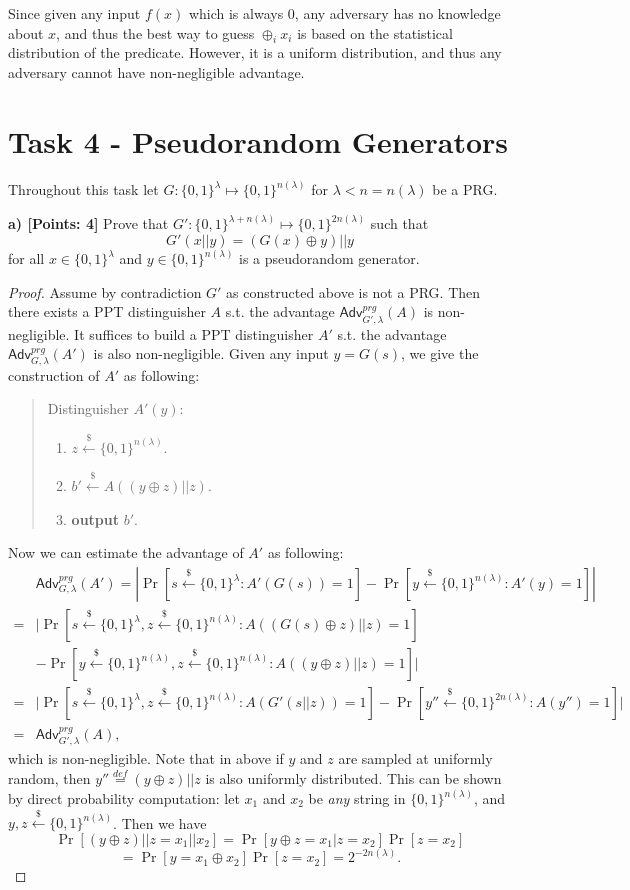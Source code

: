 \documentclass[12pt]{article}
\newcommand{\eqdef}{\stackrel{def}{=}}
\newcommand{\bits}{\{0,1\}}
\newcommand{\getsr}{\stackrel{\$}{\gets}}
\newcommand{\Adv}{\textsf{Adv}}
\theoremstyle{definition}
\begin{document}
Since given any input $f(x)$ which is always 0, any adversary has no knowledge about $x$, and thus the best way to guess $\oplus_i x_i$ is based on the statistical distribution of the predicate. However, it is a uniform distribution, and thus any adversary cannot have non-negligible advantage.


\section{Task 4 - Pseudorandom Generators}
Throughout this task let $G : \bits^\lambda \mapsto \bits^{n(\lambda)}$ for $\lambda<n=n(\lambda)$ be a PRG.

{\bf a) [Points: 4]} Prove that $G' : \bits^{\lambda + n(\lambda)} \mapsto \bits^{2n(\lambda)}$ such that
$$G'(x||y) = (G(x)\oplus y)||y$$
for all $x\in\bits^\lambda$ and $y\in \bits^{n(\lambda)}$ is a pseudorandom generator.
\begin{proof}
Assume by contradiction $G'$ as constructed above is not a PRG. Then there exists a PPT distinguisher $A$ s.t. the advantage $\Adv_{G',\lambda}^{prg}(A)$ is non-negligible. It suffices to build a PPT distinguisher $A'$ s.t. the advantage $\Adv_{G,\lambda}^{prg}(A')$ is also non-negligible. Given any input $y = G(s)$, we give the construction of $A'$ as following:
\begin{quote}
Distinguisher $A'(y)$:
\begin{enumerate}
\item $z\getsr \bits^{n(\lambda)}$.
\item $b' \getsr A((y\oplus z)||z)$.
\item {\bf output} $b'$.
\end{enumerate}
\end{quote}
Now we can estimate the advantage of $A'$ as following:
$$
\begin{aligned}
&\Adv_{G,\lambda}^{prg}(A') = \left| \Pr[s\getsr\bits^\lambda : A'(G(s))=1] - \Pr[y\getsr\bits^{n(\lambda)} : A'(y)=1] \right| \\
=&\bigg| \Pr[s\getsr\bits^\lambda, z\getsr \bits^{n(\lambda)} : A((G(s)\oplus z)||z)=1]\\
 &- \Pr[y\getsr\bits^{n(\lambda)}, z\getsr \bits^{n(\lambda)} : A((y\oplus z)||z)=1] \bigg| \\
=&\bigg| \Pr[s\getsr\bits^\lambda, z\getsr \bits^{n(\lambda)} : A(G'(s||z))=1] - \Pr[y''\getsr\bits^{2n(\lambda)} : A(y'')=1] \bigg| \\
=&\Adv_{G',\lambda}^{prg}(A),
\end{aligned}
$$
which is non-negligible. Note that in above if $y$ and $z$ are sampled at uniformly random, then $y'' \eqdef (y\oplus z)||z$ is also uniformly distributed. This can be shown by direct probability computation: let $x_1$ and $x_2$ be \emph{any} string in $\bits^{n(\lambda)}$, and $y,z \getsr\bits^{n(\lambda)}$. Then we have
$$\Pr[(y\oplus z)||z = x_1||x_2] = \Pr[y\oplus z = x_1 | z=x_2]\Pr[z=x_2]$$
$$=\Pr[y = x_1\oplus x_2]\Pr[z=x_2] = 2^{-2n(\lambda)}.$$
\end{proof}
\end{document}
